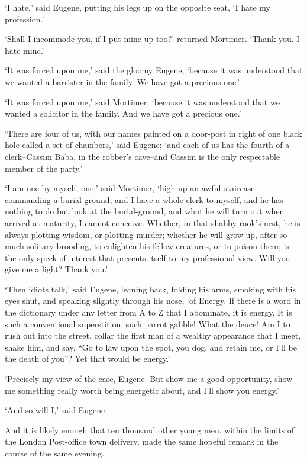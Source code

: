 ‘I hate,’ said Eugene, putting his legs up on the opposite seat, ‘I hate
my profession.’

‘Shall I incommode you, if I put mine up too?’ returned Mortimer. ‘Thank
you. I hate mine.’

‘It was forced upon me,’ said the gloomy Eugene, ‘because it was
understood that we wanted a barrister in the family. We have got a
precious one.’

‘It was forced upon me,’ said Mortimer, ‘because it was understood that
we wanted a solicitor in the family. And we have got a precious one.’

‘There are four of us, with our names painted on a door-post in right of
one black hole called a set of chambers,’ said Eugene; ‘and each of us
has the fourth of a clerk--Cassim Baba, in the robber’s cave--and Cassim
is the only respectable member of the party.’

‘I am one by myself, one,’ said Mortimer, ‘high up an awful staircase
commanding a burial-ground, and I have a whole clerk to myself, and he
has nothing to do but look at the burial-ground, and what he will turn
out when arrived at maturity, I cannot conceive. Whether, in that shabby
rook’s nest, he is always plotting wisdom, or plotting murder; whether
he will grow up, after so much solitary brooding, to enlighten his
fellow-creatures, or to poison them; is the only speck of interest that
presents itself to my professional view. Will you give me a light? Thank
you.’

‘Then idiots talk,’ said Eugene, leaning back, folding his arms, smoking
with his eyes shut, and speaking slightly through his nose, ‘of Energy.
If there is a word in the dictionary under any letter from A to Z that
I abominate, it is energy. It is such a conventional superstition, such
parrot gabble! What the deuce! Am I to rush out into the street, collar
the first man of a wealthy appearance that I meet, shake him, and say,
“Go to law upon the spot, you dog, and retain me, or I’ll be the death
of you”? Yet that would be energy.’

‘Precisely my view of the case, Eugene. But show me a good opportunity,
show me something really worth being energetic about, and I’ll show you
energy.’

‘And so will I,’ said Eugene.

And it is likely enough that ten thousand other young men, within the
limits of the London Post-office town delivery, made the same hopeful
remark in the course of the same evening.

